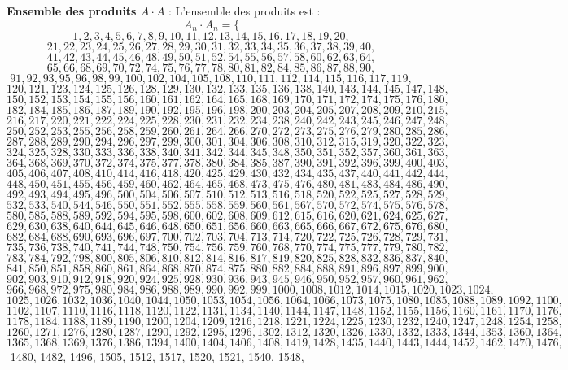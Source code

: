 \documentclass[11pt,a4paper]{article}
\begin{document}
\textbf{Ensemble des produits $A \cdot A$} :
L'ensemble des produits est :
$$ A_{{{n}}} \cdot A_{{{n}}} = \{ $$$$ 1, 2, 3, 4, 5, 6, 7, 8, 9, 10, 11, 12, 13, 14, 15, 16, 17, 18, 19, 20, $$$$ 21, 22, 23, 24, 25, 26, 27, 28, 29, 30, 31, 32, 33, 34, 35, 36, 37, 38, 39, 40, $$$$ 41, 42, 43, 44, 45, 46, 48, 49, 50, 51, 52, 54, 55, 56, 57, 58, 60, 62, 63, 64, $$$$ 65, 66, 68, 69, 70, 72, 74, 75, 76, 77, 78, 80, 81, 82, 84, 85, 86, 87, 88, 90, $$$$ 91, 92, 93, 95, 96, 98, 99, 100, 102, 104, 105, 108, 110, 111, 112, 114, 115, 116, 117, 119, $$$$ 120, 121, 123, 124, 125, 126, 128, 129, 130, 132, 133, 135, 136, 138, 140, 143, 144, 145, 147, 148, $$$$ 150, 152, 153, 154, 155, 156, 160, 161, 162, 164, 165, 168, 169, 170, 171, 172, 174, 175, 176, 180, $$$$ 182, 184, 185, 186, 187, 189, 190, 192, 195, 196, 198, 200, 203, 204, 205, 207, 208, 209, 210, 215, $$$$ 216, 217, 220, 221, 222, 224, 225, 228, 230, 231, 232, 234, 238, 240, 242, 243, 245, 246, 247, 248, $$$$ 250, 252, 253, 255, 256, 258, 259, 260, 261, 264, 266, 270, 272, 273, 275, 276, 279, 280, 285, 286, $$$$ 287, 288, 289, 290, 294, 296, 297, 299, 300, 301, 304, 306, 308, 310, 312, 315, 319, 320, 322, 323, $$$$ 324, 325, 328, 330, 333, 336, 338, 340, 341, 342, 344, 345, 348, 350, 351, 352, 357, 360, 361, 363, $$$$ 364, 368, 369, 370, 372, 374, 375, 377, 378, 380, 384, 385, 387, 390, 391, 392, 396, 399, 400, 403, $$$$ 405, 406, 407, 408, 410, 414, 416, 418, 420, 425, 429, 430, 432, 434, 435, 437, 440, 441, 442, 444, $$$$ 448, 450, 451, 455, 456, 459, 460, 462, 464, 465, 468, 473, 475, 476, 480, 481, 483, 484, 486, 490, $$$$ 492, 493, 494, 495, 496, 500, 504, 506, 507, 510, 512, 513, 516, 518, 520, 522, 525, 527, 528, 529, $$$$ 532, 533, 540, 544, 546, 550, 551, 552, 555, 558, 559, 560, 561, 567, 570, 572, 574, 575, 576, 578, $$$$ 580, 585, 588, 589, 592, 594, 595, 598, 600, 602, 608, 609, 612, 615, 616, 620, 621, 624, 625, 627, $$$$ 629, 630, 638, 640, 644, 645, 646, 648, 650, 651, 656, 660, 663, 665, 666, 667, 672, 675, 676, 680, $$$$ 682, 684, 688, 690, 693, 696, 697, 700, 702, 703, 704, 713, 714, 720, 722, 725, 726, 728, 729, 731, $$$$ 735, 736, 738, 740, 741, 744, 748, 750, 754, 756, 759, 760, 768, 770, 774, 775, 777, 779, 780, 782, $$$$ 783, 784, 792, 798, 800, 805, 806, 810, 812, 814, 816, 817, 819, 820, 825, 828, 832, 836, 837, 840, $$$$ 841, 850, 851, 858, 860, 861, 864, 868, 870, 874, 875, 880, 882, 884, 888, 891, 896, 897, 899, 900, $$$$ 902, 903, 910, 912, 918, 920, 924, 925, 928, 930, 936, 943, 945, 946, 950, 952, 957, 960, 961, 962, $$$$ 966, 968, 972, 975, 980, 984, 986, 988, 989, 990, 992, 999, 1000, 1008, 1012, 1014, 1015, 1020, 1023, 1024, $$$$ 1025, 1026, 1032, 1036, 1040, 1044, 1050, 1053, 1054, 1056, 1064, 1066, 1073, 1075, 1080, 1085, 1088, 1089, 1092, 1100, $$$$ 1102, 1107, 1110, 1116, 1118, 1120, 1122, 1131, 1134, 1140, 1144, 1147, 1148, 1152, 1155, 1156, 1160, 1161, 1170, 1176, $$$$ 1178, 1184, 1188, 1189, 1190, 1200, 1204, 1209, 1216, 1218, 1221, 1224, 1225, 1230, 1232, 1240, 1247, 1248, 1254, 1258, $$$$ 1260, 1271, 1276, 1280, 1287, 1290, 1292, 1295, 1296, 1302, 1312, 1320, 1326, 1330, 1332, 1333, 1344, 1353, 1360, 1364, $$$$ 1365, 1368, 1369, 1376, 1386, 1394, 1400, 1404, 1406, 1408, 1419, 1428, 1435, 1440, 1443, 1444, 1452, 1462, 1470, 1476, $$$$ 1480, 1482, 1496, 1505, 1512, 1517, 1520, 1521, 1540, 1548, 
\end{document}
